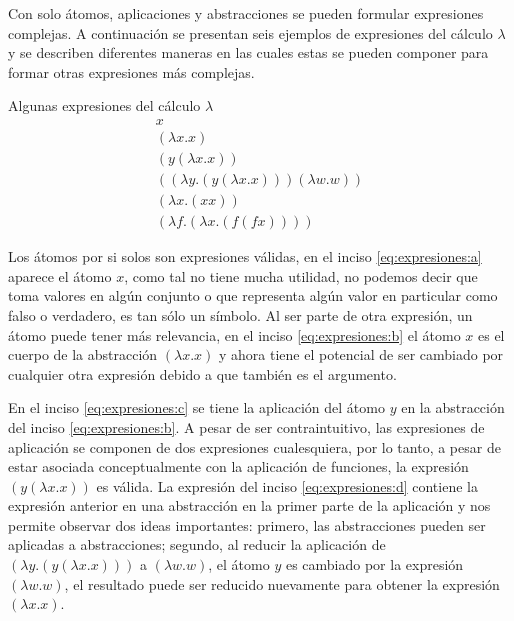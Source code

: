 Con solo átomos, aplicaciones y abstracciones se pueden formular expresiones complejas. A continuación se presentan seis ejemplos de expresiones del cálculo \( λ \) y se describen diferentes maneras en las cuales estas se pueden componer para formar otras expresiones más complejas.

\begin{exmp}
  Algunas expresiones del cálculo \( λ \)
  \label{exmp:expresiones}
  \begin{subequations}
    \begin{gather}
      \label{eq:expresiones:a} \tag{a}
      x \\
      \label{eq:expresiones:b} \tag{b}
      (λx.x) \\
      \label{eq:expresiones:c} \tag{c}
      (y(λx.x)) \\
      \label{eq:expresiones:d} \tag{d}
      ((λy.(y(λx.x)))(λw.w)) \\
      \label{eq:expresiones:e} \tag{e}
      (λx.(x x)) \\
      \label{eq:expresiones:f} \tag{f}
      (λf.(λx.(f(f x))))
    \end{gather}
  \end{subequations}
\end{exmp}


Los átomos por si solos son expresiones válidas, en el inciso \eqref{eq:expresiones:a} aparece el átomo \( x \), como tal no tiene mucha utilidad, no podemos decir que toma valores en algún conjunto o que representa algún valor en particular como falso o verdadero, es tan sólo un símbolo. Al ser parte de otra expresión, un átomo puede tener más relevancia, en el inciso \eqref{eq:expresiones:b} el átomo \( x \) es el cuerpo de la abstracción \( (λx.x) \) y ahora tiene el potencial de ser cambiado por cualquier otra expresión debido a que también es el argumento.

En el inciso \eqref{eq:expresiones:c} se tiene la aplicación del átomo \( y \) en la abstracción del inciso \eqref{eq:expresiones:b}. A pesar de ser contraintuitivo, las expresiones de aplicación se componen de dos expresiones cualesquiera, por lo tanto, a pesar de estar asociada conceptualmente con la aplicación de funciones, la expresión \( (y (λx.x)) \) es válida. La expresión del inciso \eqref{eq:expresiones:d} contiene la expresión anterior en una abstracción en la primer parte de la aplicación y nos permite observar dos ideas importantes: primero, las abstracciones pueden ser aplicadas a abstracciones; segundo, al reducir la aplicación de \( (λy.(y(λx.x))) \) a \( (λw.w) \), el átomo \( y \) es cambiado por la expresión \( (λw.w) \), el resultado puede ser reducido nuevamente para obtener la expresión \( (λx.x) \).

